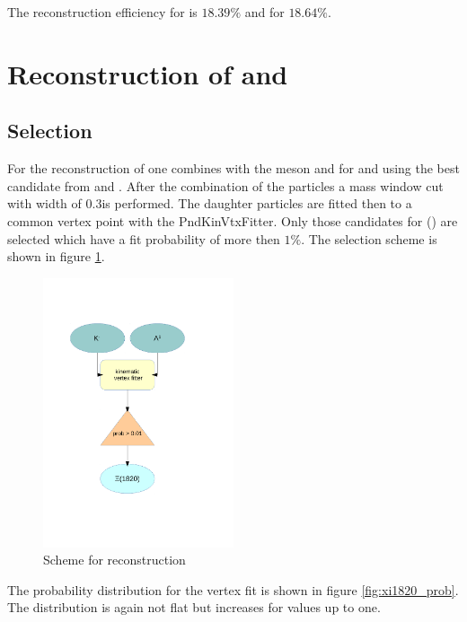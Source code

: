 		The reconstruction efficiency for \anticascade is $18.39\%$ and for \cascade $18.64\%$.
		
	
	
	

\section{Reconstruction of \excitedcascade and \excitedanticascade}
		\subsection*{Selection}

		For the reconstruction of \excitedcascade one combines \lam with the \kminus meson and for \excitedanticascade \alam and \kplus using the
		best candidate from \lam and \alam.
		After the combination of the particles a mass window cut with width of $0.3$\massunit is performed. 
		The daughter particles are fitted then to a common vertex point with the PndKinVtxFitter.
		Only those candidates for \excitedcascade (\excitedanticascade) are selected which have a fit probability of more then $1\%$.
		The selection scheme is shown in figure \ref{fig:excitedcascade_scheme}. 
		
		\begin{figure}
			\centering
				\includegraphics[width=0.50\textwidth]{./plots/combineExcitedCascade.pdf}
			\caption{\propose Scheme for \excitedcascade reconstruction}
			\label{fig:excitedcascade_scheme}
		\end{figure}
		
		
		The \chisq probability distribution for the vertex fit is shown in figure \ref{fig:xi1820_prob}.
		The distribution is again not flat but increases for values up to one. 
		
